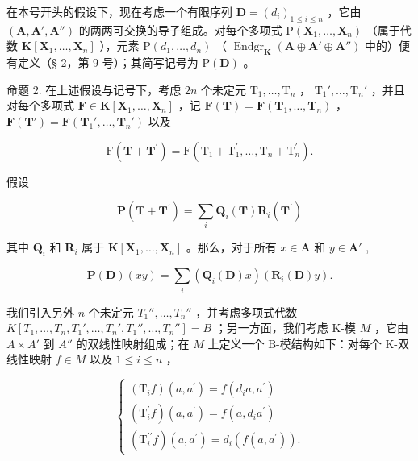 在本号开头的假设下，现在考虑一个有限序列 \(\mathbf{D} = (d_i)_{1 \leqslant i \leqslant n}\) ，它由 \((\mathbf{A}, \mathbf{A}', \mathbf{A}'')\) 的两两可交换的导子组成。对每个多项式 \(\mathrm{P}(\mathbf{X}_1, \ldots, \mathbf{X}_n)\) （属于代数 \(\mathbf{K}[\mathbf{X}_1, \ldots, \mathbf{X}_n]\) ），元素 \(\mathrm{P}(d_1, \ldots, d_n)\) （ \(\operatorname{Endgr}_{\mathbf{K}}(\mathbf{A} \oplus \mathbf{A}' \oplus \mathbf{A}'')\) 中的）便有定义（§ 2，第 9 号）；其简写记号为 \(\mathrm{P}(\mathbf{D})\) 。

命题 2. 在上述假设与记号下，考虑 \(2n\) 个未定元 \(\mathrm{T}_1, \ldots, \mathrm{T}_n\) ， \(\mathrm{T}_1', \ldots, \mathrm{T}_n'\) ，并且对每个多项式 \(\mathbf{F} \in \mathbf{K}[\mathbf{X}_1, \ldots, \mathbf{X}_n]\) ，记 \(\mathbf{F}(\mathbf{T}) = \mathbf{F}(\mathbf{T}_1, \ldots, \mathbf{T}_n)\) ， \(\mathbf{F}(\mathbf{T}') = \mathbf{F}(\mathbf{T}_1', \ldots, \mathbf{T}_n')\) 以及

\[
\mathrm{F} (\mathbf {T} + \mathbf {T} ^ {\prime}) = \mathrm{F} (\mathrm{T} _ {1} + \mathrm{T} _ {1} ^ {\prime}, \dots , \mathrm{T} _ {n} + \mathrm{T} _ {n} ^ {\prime}).
\]

假设

\[
\mathbf {P} (\mathbf {T} + \mathbf {T} ^ {\prime}) = \sum_ {i} \mathbf {Q} _ {i} (\mathbf {T}) \mathbf {R} _ {i} (\mathbf {T} ^ {\prime})
\]

其中 \(\mathbf{Q}_i\) 和 \(\mathbf{R}_i\) 属于 \(\mathbf{K}[\mathbf{X}_1,\ldots ,\mathbf{X}_n]\) 。那么，对于所有 \(x\in \mathbf{A}\) 和 \(y\in \mathbf{A}'\) ,

\[
\mathbf {P} (\mathbf {D}) (x y) = \sum_ {i} \left(\mathbf {Q} _ {i} (\mathbf {D}) x\right) (\mathbf {R} _ {i} (\mathbf {D}) y).\tag{12}
\]

我们引入另外 \(n\) 个未定元 \(T_1'', \ldots, T_n''\) ，并考虑多项式代数 \(K[T_1, \ldots, T_n, T_1', \ldots, T_n', T_1'', \ldots, T_n''] = B\) ；另一方面，我们考虑 K-模 \(M\) ，它由 \(A \times A'\) 到 \(A''\) 的双线性映射组成；在 \(M\) 上定义一个 B-模结构如下：对每个 K-双线性映射 \(f \in M\) 以及 \(1 \leqslant i \leqslant n\) ，

\[
\left\{ \begin{array}{l} (\mathrm{T} _ {i} f) (a, a ^ {\prime}) = f (d _ {i} a, a ^ {\prime}) \\ (\mathrm{T} _ {i} ^ {\prime} f) (a, a ^ {\prime}) = f (a, d _ {i} a ^ {\prime}) \\ (\mathrm{T} _ {i} ^ {\prime \prime} f) (a, a ^ {\prime}) = d _ {i} (f (a, a ^ {\prime})). \end{array} \right.\tag{13}
\]

